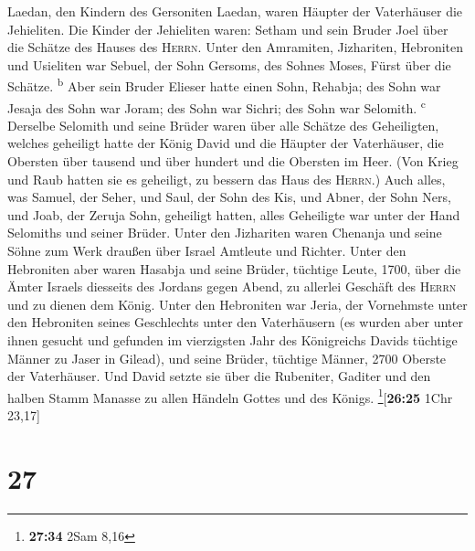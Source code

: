 Laedan, den Kindern des Gersoniten Laedan, waren Häupter der Vaterhäuser
die Jehieliten.  Die Kinder der Jehieliten waren: Setham
und sein Bruder Joel über die Schätze des Hauses des \textsc{Herrn}.
 Unter den Amramiten, Jizhariten, Hebroniten und
Usieliten  war Sebuel, der Sohn Gersoms, des Sohnes
Moses, Fürst über die Schätze. \textsuperscript{b}  Aber
sein Bruder Elieser hatte einen Sohn, Rehabja; des Sohn war Jesaja des
Sohn war Joram; des Sohn war Sichri; des Sohn war Selomith.
\textsuperscript{c}  Derselbe Selomith und seine Brüder
waren über alle Schätze des Geheiligten, welches geheiligt hatte der
König David und die Häupter der Vaterhäuser, die Obersten über tausend
und über hundert und die Obersten im Heer.  (Von Krieg
und Raub hatten sie es geheiligt, zu bessern das Haus des
\textsc{Herrn}.)  Auch alles, was Samuel, der Seher, und
Saul, der Sohn des Kis, und Abner, der Sohn Ners, und Joab, der Zeruja
Sohn, geheiligt hatten, alles Geheiligte war unter der Hand Selomiths
und seiner Brüder.  Unter den Jizhariten waren Chenanja
und seine Söhne zum Werk draußen über Israel Amtleute und Richter.
 Unter den Hebroniten aber waren Hasabja und seine
Brüder, tüchtige Leute, 1700, über die Ämter Israels diesseits des
Jordans gegen Abend, zu allerlei Geschäft des \textsc{Herrn} und zu
dienen dem König.  Unter den Hebroniten war Jeria, der
Vornehmste unter den Hebroniten seines Geschlechts unter den
Vaterhäusern (es wurden aber unter ihnen gesucht und gefunden im
vierzigsten Jahr des Königreichs Davids tüchtige Männer zu Jaser in
Gilead),  und seine Brüder, tüchtige Männer, 2700 Oberste
der Vaterhäuser. Und David setzte sie über die Rubeniter, Gaditer und
den halben Stamm Manasse zu allen Händeln Gottes und des Königs.
\footnote{\textbf{27:34} 2Sam 8,16}{[}\textbf{26:25} 1Chr 23,17{]}

\hypertarget{section-26}{%
\section{27}\label{section-26}}

